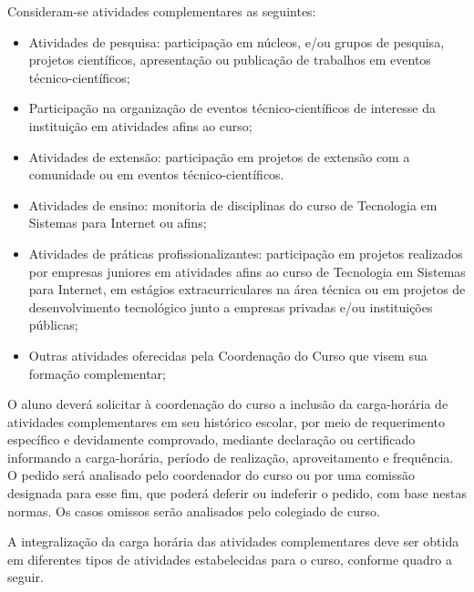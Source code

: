 Consideram-se atividades complementares as seguintes:

\begin{itemize}
	\item Atividades de pesquisa: participação em núcleos, e/ou grupos de pesquisa, projetos científicos, apresentação ou publicação de trabalhos em eventos técnico-científicos;
	\item Participação na organização de eventos técnico-científicos de interesse da instituição em atividades afins ao curso;
	\item Atividades de extensão: participação em projetos de extensão com a comunidade ou em eventos técnico-científicos.
	\item Atividades de ensino: monitoria de disciplinas do curso de Tecnologia em Sistemas para Internet ou afins;
	\item Atividades de práticas profissionalizantes: participação em projetos realizados por empresas juniores em atividades afins ao curso de Tecnologia em Sistemas para Internet, em estágios extracurriculares na área técnica ou em projetos de desenvolvimento tecnológico junto a empresas privadas e/ou instituições públicas;
	\item Outras atividades oferecidas pela Coordenação do Curso que visem sua formação complementar;
\end{itemize}

	O aluno deverá solicitar à coordenação do curso a inclusão da carga-horária de atividades complementares em seu histórico escolar, por meio de requerimento específico e devidamente comprovado, mediante declaração ou certificado informando a carga-horária, período de realização, aproveitamento e frequência. O pedido será analisado pelo coordenador do curso ou por uma comissão designada para esse fim, que poderá deferir ou indeferir o pedido, com base nestas normas. Os casos omissos serão analisados pelo colegiado de curso.
	
	A integralização da carga horária das atividades complementares deve ser obtida em diferentes tipos de atividades estabelecidas para o curso, conforme quadro a seguir.

